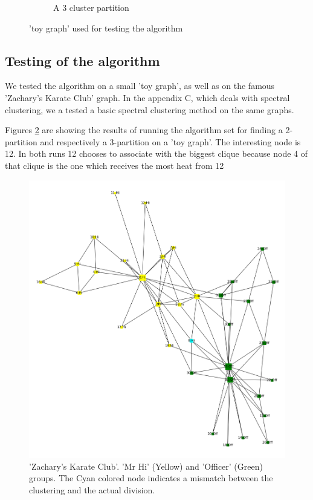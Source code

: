 \begin{figure}
\begin{framed}
\begin{subfigure}[b]{0.5\textwidth}
\caption{A 3 cluster partition}
\label{fig:examplecoolwarm3cluster}
\end{subfigure}
\caption{'toy graph' used for testing the algorithm}
\label{fig:exampleCoolWarmClustering}
\end{framed}
\end{figure}

\subsection*{Testing of the algorithm}

We tested the algorithm on a small 'toy graph', as well as on the
famous 'Zachary's Karate Club' graph. In the appendix C, which deals
with spectral clustering, we a tested a basic spectral clustering 
method on the same graphs.

Figures \ref{fig:exampleCoolWarmClustering} are showing the results
of running the algorithm set for finding a 2-partition and
respectively a 3-partition on a 'toy graph'. The interesting node is
12. In both runs 12 chooses to associate with the biggest clique
because node 4 of that clique is the one which receives the most
heat from 12

\begin{figure}[!htb]
\begin{framed}
\centering
\includegraphics[width=0.75\linewidth]{figures/Karate_coolwarmclustering.png}
\caption{
'Zachary's Karate Club'.
'Mr Hi' (Yellow) and 'Officer' (Green) groups.
The Cyan colored node indicates a mismatch between the clustering
and the actual division.
}
\label{fig:karatecoolwarm}
\end{framed}
\end{figure}

